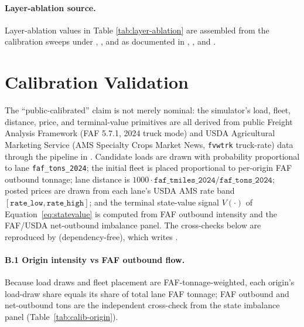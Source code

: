 \documentclass[11pt]{article}
\begin{document}
\paragraph{Layer-ablation source.}
Layer-ablation values in Table \ref{tab:layer-ablation} are assembled from
the calibration sweeps under
,
, and
 as
documented in ,
, and
.

\section{Calibration Validation}
\label{sec:calibration}

The ``public-calibrated'' claim is not merely nominal: the simulator's
load, fleet, distance, price, and terminal-value primitives are all
derived from public Freight Analysis Framework (FAF 5.7.1, 2024 truck
mode) and USDA Agricultural Marketing Service (AMS Specialty Crops Market
News, \texttt{fvwtrk} truck-rate) data through the pipeline in
. Candidate loads are drawn with
probability proportional to lane \texttt{faf\_tons\_2024}; the initial
fleet is placed proportional to per-origin FAF outbound tonnage; lane
distance is $1000 \cdot \texttt{faf\_tmiles\_2024} / \texttt{faf\_tons\_2024}$;
posted prices are drawn from each lane's USDA AMS rate band
$[\texttt{rate\_low}, \texttt{rate\_high}]$; and the terminal state-value
signal $V(\cdot)$ of Equation~\eqref{eq:statevalue} is computed from FAF
outbound intensity and the FAF/USDA net-outbound imbalance panel. The
cross-checks below are reproduced by 
(dependency-free), which writes .

\paragraph{B.1 Origin intensity vs FAF outbound flow.}
Because load draws and fleet placement are FAF-tonnage-weighted, each
origin's load-draw share equals its share of total lane FAF tonnage; FAF
outbound and net-outbound tons are the independent cross-check from the
state imbalance panel (Table~\ref{tab:calib-origin}).
\end{document}
